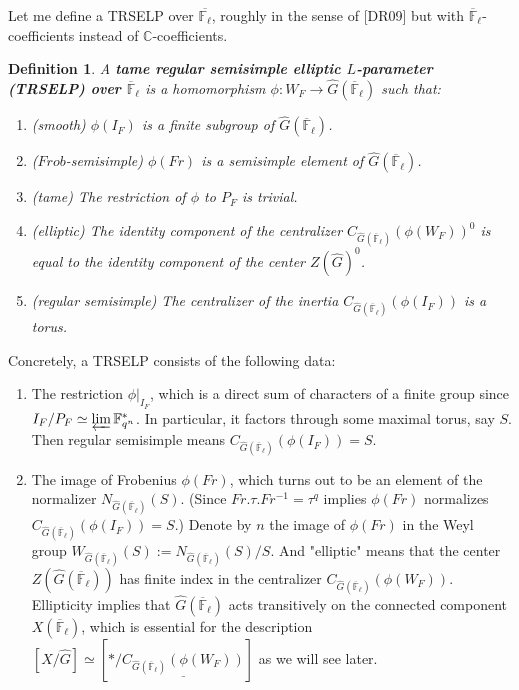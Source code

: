 \documentclass{article}
\newtheorem{definition}{Definition}
\begin{document}
	Let me define a TRSELP over $\overline{\mathbb{F}_{\ell}}$, roughly in the sense of [DR09] but with $\overline{\mathbb{F}}_{\ell}$-coefficients instead of $\mathbb{C}$-coefficients.
	
	\begin{definition}
		A \textbf{tame regular semisimple elliptic $L$-parameter (TRSELP) over $\overline{\mathbb{F}}_{\ell}$} is a homomorphism $\phi: W_F \to \hat{G}(\overline{\mathbb{F}}_{\ell})$ such that:
		\begin{enumerate}
			\item (smooth) $\phi(I_F)$ is a finite subgroup of $\hat{G}(\overline{\mathbb{F}}_{\ell})$. 	 
			\item ($Frob$-semisimple) $\phi(Fr)$ is a semisimple element of $\hat{G}(\overline{\mathbb{F}}_{\ell})$.
			\item (tame) The restriction of $\phi$ to $P_F$ is trivial.
			\item (elliptic) The identity component of the centralizer $C_{\hat{G}(\overline{\mathbb{F}}_{\ell})}(\phi(W_F))^0$ is equal to the identity component of the center $Z(\hat{G})^0$.
			\item (regular semisimple) The centralizer of the inertia $C_{\hat{G}(\overline{\mathbb{F}}_{\ell})}(\phi(I_F))$ is a torus.
		\end{enumerate}
	\end{definition}
	
	Concretely, a TRSELP consists of the following data:
	\begin{enumerate}
		\item The restriction $\phi|_{I_F}$, which is a direct sum of characters of a finite group since $I_F/P_F \simeq \varprojlim\mathbb{F}_{q^n}^*$. In particular, it factors through some maximal torus, say $S$. Then regular semisimple means $C_{\hat{G}(\overline{\mathbb{F}}_{\ell})}(\phi(I_F))=S$.
		\item The image of Frobenius $\phi(Fr)$, which turns out to be an element of the normalizer  $N_{\hat{G}(\overline{\mathbb{F}}_{\ell})}(S)$. (Since $Fr.\tau.Fr^{-1}=\tau^q$ implies $\phi(Fr)$ normalizes $C_{\hat{G}(\overline{\mathbb{F}}_{\ell})}(\phi(I_F))=S$.) Denote by $n$ the image of $\phi(Fr)$ in the Weyl group $W_{\hat{G}(\overline{\mathbb{F}}_{\ell})}(S):=N_{\hat{G}(\overline{\mathbb{F}}_{\ell})}(S)/S$. And "elliptic" means that the center $Z(\hat{G}(\overline{\mathbb{F}}_{\ell}))$ has finite index in the centralizer $C_{\hat{G}(\overline{\mathbb{F}}_{\ell})}(\phi(W_F))$. Ellipticity implies that $\hat{G}(\overline{\mathbb{F}}_{\ell})$ acts transitively on the connected component $X(\overline{\mathbb{F}}_{\ell})$, which is essential for the description $[X/\hat{G}] \simeq [*/\underline{C_{\hat{G}(\overline{\mathbb{F}}_{\ell})}(\phi(W_F))}]$ as we will see later. 
	\end{enumerate}
	
\end{document}
